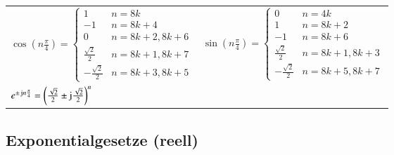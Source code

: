\begin{center}
\begin{tabular}{ll}
        \noalign{\vspace{0.15cm}}
        $\cos\left(n\frac{\pi}{4}\right) = \begin{cases} 1 & n = 8k \\ -1 & n = 8k+4 \\ 0 & n = 8k+2, 8k+6 \\ \frac{\sqrt{2}}{2} & n = 8k+1, 8k+7 \\ -\frac{\sqrt{2}}{2} & n = 8k+3, 8k+5 \end{cases}$ &
        $\sin\left(n\frac{\pi}{4}\right) = \begin{cases} 0 & n = 4k \\ 1 & n = 8k+2 \\ -1 & n = 8k+6 \\ \frac{\sqrt{2}}{2} & n = 8k+1, 8k+3 \\ -\frac{\sqrt{2}}{2} & n = 8k+5, 8k+7 \end{cases}$         \\
        \noalign{\vspace{0.15cm}}
        $e^{\pm\mathop{} \! \mathrm{j} n\frac{\pi}{4}} = \left(\frac{\sqrt{2}}{2} \pm \mathop{} \! \mathrm{j}\frac{\sqrt{2}}{2}\right)^n$                                                                                                                                &
    \end{tabular}
\end{center}

\subsection{Exponentialgesetze (reell)}

